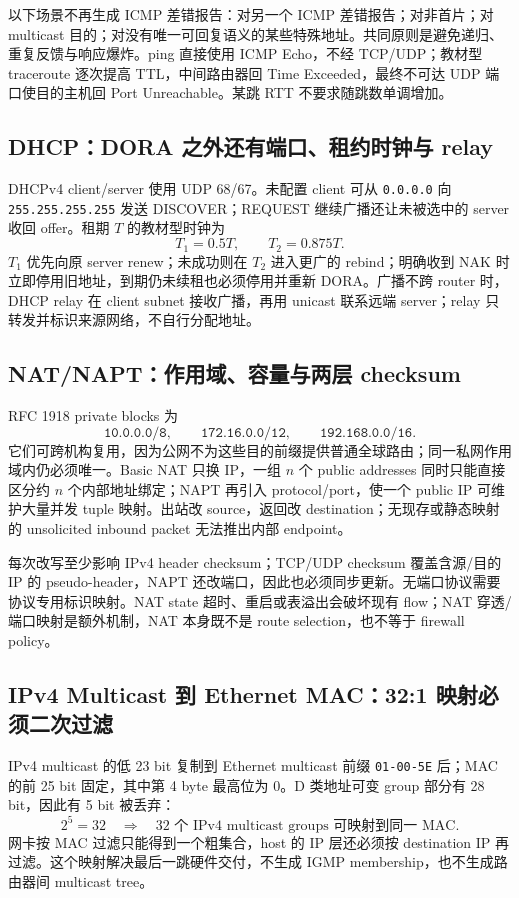 \documentclass[11pt,a4paper]{ctexart}
\newcommand{\code}[1]{\texttt{#1}}
\begin{document}
以下场景不再生成 ICMP 差错报告：对另一个 ICMP 差错报告；对非首片；对 multicast 目的；对没有唯一可回复语义的某些特殊地址。共同原则是避免递归、重复反馈与响应爆炸。ping 直接使用 ICMP Echo，不经 TCP/UDP；教材型 traceroute 逐次提高 TTL，中间路由器回 Time Exceeded，最终不可达 UDP 端口使目的主机回 Port Unreachable。某跳 RTT 不要求随跳数单调增加。

\subsection{DHCP：DORA 之外还有端口、租约时钟与 relay}

DHCPv4 client/server 使用 UDP 68/67。未配置 client 可从 \code{0.0.0.0} 向 \code{255.255.255.255} 发送 DISCOVER；REQUEST 继续广播还让未被选中的 server 收回 offer。租期 $T$ 的教材型时钟为
\[
T_1=0.5T,\qquad T_2=0.875T.
\]
$T_1$ 优先向原 server renew；未成功则在 $T_2$ 进入更广的 rebind；明确收到 NAK 时立即停用旧地址，到期仍未续租也必须停用并重新 DORA。广播不跨 router 时，DHCP relay 在 client subnet 接收广播，再用 unicast 联系远端 server；relay 只转发并标识来源网络，不自行分配地址。

\subsection{NAT/NAPT：作用域、容量与两层 checksum}

RFC 1918 private blocks 为
\[
\code{10.0.0.0/8},\qquad
\code{172.16.0.0/12},\qquad
\code{192.168.0.0/16}.
\]
它们可跨机构复用，因为公网不为这些目的前缀提供普通全球路由；同一私网作用域内仍必须唯一。Basic NAT 只换 IP，一组 $n$ 个 public addresses 同时只能直接区分约 $n$ 个内部地址绑定；NAPT 再引入 protocol/port，使一个 public IP 可维护大量并发 tuple 映射。出站改 source，返回改 destination；无现存或静态映射的 unsolicited inbound packet 无法推出内部 endpoint。

每次改写至少影响 IPv4 header checksum；TCP/UDP checksum 覆盖含源/目的 IP 的 pseudo-header，NAPT 还改端口，因此也必须同步更新。无端口协议需要协议专用标识映射。NAT state 超时、重启或表溢出会破坏现有 flow；NAT 穿透/端口映射是额外机制，NAT 本身既不是 route selection，也不等于 firewall policy。

\subsection{IPv4 Multicast 到 Ethernet MAC：32:1 映射必须二次过滤}

IPv4 multicast 的低 23 bit 复制到 Ethernet multicast 前缀 \code{01-00-5E} 后；MAC 的前 25 bit 固定，其中第 4 byte 最高位为 0。D 类地址可变 group 部分有 28 bit，因此有 5 bit 被丢弃：
\[
2^5=32\quad\Longrightarrow\quad
\text{32 个 IPv4 multicast groups 可映射到同一 MAC}.
\]
网卡按 MAC 过滤只能得到一个粗集合，host 的 IP 层还必须按 destination IP 再过滤。这个映射解决最后一跳硬件交付，不生成 IGMP membership，也不生成路由器间 multicast tree。
\end{document}
